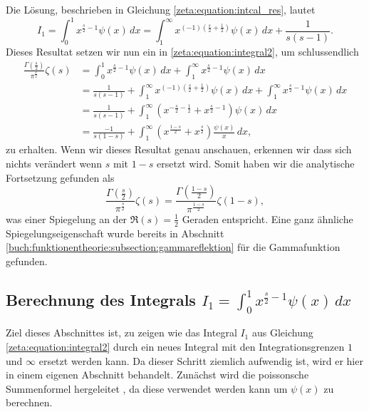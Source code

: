 Die Lösung, beschrieben in Gleichung \eqref{zeta:equation:intcal_res}, lautet
\begin{equation*}
    I_1
    =
    \int_0^{1}
    x^{\frac{s}{2}-1}
    \psi(x)
    \,dx
    =
    \int_{1}^{\infty}
    x^{(-1) \left(\frac{s}{2}+\frac{1}{2}\right)}
    \psi(x)
    \,dx
    +
    \frac{1}{s(s-1)}.
\end{equation*}
Dieses Resultat setzen wir nun ein in \eqref{zeta:equation:integral2}, um schlussendlich
\begin{align}
    \frac{\Gamma \left( \frac{s}{2} \right)}{\pi^{\frac{s}{2}}}
    \zeta(s)
    &=
    \int_0^{1}
    x^{\frac{s}{2}-1}
    \psi(x)
    \,dx
    +
    \int_1^{\infty}
    x^{\frac{s}{2}-1}
    \psi(x)
    \,dx
    \nonumber
    \\
    &=
    \frac{1}{s(s-1)}
    +
    \int_{1}^{\infty}
    x^{(-1) \left(\frac{s}{2}+\frac{1}{2}\right)}
    \psi(x)
    \,dx
    +
    \int_1^{\infty}
    x^{\frac{s}{2}-1}
    \psi(x)
    \,dx
    \\
    &=
    \frac{1}{s(s-1)}
    +
    \int_{1}^{\infty}
    \left(
    x^{-\frac{s}{2}-\frac{1}{2}}
    +
    x^{\frac{s}{2}-1}
    \right)
    \psi(x)
    \,dx
    \\
    &=
    \frac{-1}{s(1-s)}
    +
    \int_{1}^{\infty}
    \left(
    x^{\frac{1-s}{2}}
    +
    x^{\frac{s}{2}}
    \right)
    \frac{\psi(x)}{x}
    \,dx,
\end{align}
zu erhalten.
Wenn wir dieses Resultat genau anschauen, erkennen wir dass sich nichts verändert wenn $s$ mit $1-s$ ersetzt wird.
Somit haben wir die analytische Fortsetzung gefunden als
\begin{equation}\label{zeta:equation:functional}
    \frac{\Gamma \left( \frac{s}{2} \right)}{\pi^{\frac{s}{2}}}
    \zeta(s)
    =
    \frac{\Gamma \left( \frac{1-s}{2} \right)}{\pi^{\frac{1-s}{2}}}
    \zeta(1-s),
\end{equation}
was einer Spiegelung an der $\Re(s) = \frac{1}{2}$ Geraden entspricht.
Eine ganz ähnliche Spiegelungseigenschaft wurde bereits in Abschnitt \ref{buch:funktionentheorie:subsection:gammareflektion} für die Gammafunktion gefunden.

\subsection{Berechnung des Integrals $I_1 = \int_0^{1} x^{\frac{s}{2}-1} \psi(x) \,dx$} \label{zeta:subsubsec:intcal}

Ziel dieses Abschnittes ist, zu zeigen wie das Integral $I_1$ aus Gleichung \eqref{zeta:equation:integral2} durch ein neues Integral mit den Integrationsgrenzen $1$ und $\infty$ ersetzt werden kann.
Da dieser Schritt ziemlich aufwendig ist, wird er hier in einem eigenen Abschnitt behandelt.
Zunächst wird die poissonsche Summenformel hergeleitet \cite{zeta:online:poisson}, da diese verwendet werden kann um $\psi(x)$ zu berechnen.

